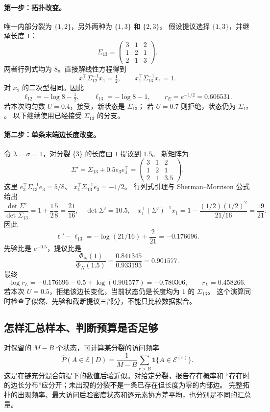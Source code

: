 \paragraph{第一步：拓扑改变。}
唯一内部分裂为 $\{1,2\}$，另外两种为 $\{1,3\}$ 和 $\{2,3\}$。
假设提议选择 $\{1,3\}$，并继承长度 $1$：
\[
 \Sigma_{13}=
 \begin{pmatrix}3&1&2\\1&2&1\\2&1&3\end{pmatrix}.
\]
两者行列式均为 $8$。直接解线性方程得到
\[
 x_1^\top\Sigma_{12}^{-1}x_1=\tfrac12,\qquad
 x_1^\top\Sigma_{13}^{-1}x_1=1.
\]
对 $x_2$ 的二次型相同。因此
\[
 \ell_{12}=-\log8-\tfrac12,\qquad
 \ell_{13}=-\log8-1,\qquad
 r_E=e^{-1/2}=0.606531.
\]
若本次均匀数 $U=0.4$，接受，新状态是 $\Sigma_{13}$；
若 $U=0.7$ 则拒绝，状态仍为 $\Sigma_{12}$。
以下继续使用已经接受 $\Sigma_{13}$ 的分支。

\paragraph{第二步：单条末端边长度改变。}
令 $\lambda=\sigma=1$，对分裂 $\{3\}$ 的长度由 $1$ 提议到 $1.5$。
新矩阵为
\[
 \Sigma'=\Sigma_{13}+0.5e_3e_3^\top
 =\begin{pmatrix}3&1&2\\1&2&1\\2&1&3.5\end{pmatrix}.
\]
这里
$e_3^\top\Sigma_{13}^{-1}e_3=5/8$、
$x_1^\top\Sigma_{13}^{-1}e_3=-1/2$。
行列式引理与 Sherman--Morrison 公式给出
\[
 \frac{\det\Sigma'}{\det\Sigma_{13}}=
 1+\frac12\frac58=\frac{21}{16},\quad
 \det\Sigma'=10.5,\quad
 x_1^\top(\Sigma')^{-1}x_1=1-\frac{(1/2)(1/2)^2}{21/16}
 =\frac{19}{21}.
\]
因此
\[
 \ell'-\ell_{13}
 =-\log(21/16)+\frac2{21}=-0.176696.
\]
先验比是 $e^{-0.5}$，提议比是
\[
 \frac{\Phi_N(1)}{\Phi_N(1.5)}
 =\frac{0.841345}{0.933193}=0.901577.
\]
最终
\[
 \log r_L=-0.176696-0.5+\log(0.901577)=-0.780306,
 \qquad r_L=0.458266.
\]
若本次 $U=0.5$，拒绝该边长变化，当前状态仍是长度均为 $1$ 的 $\Sigma_{13}$。
这个演算同时检查了似然、先验和截断提议三部分，不能只比较数据拟合。

\subsection{怎样汇总样本、判断预算是否足够}

对保留的 $M-B$ 个状态，可计算某分裂的访问频率
\[
 \widehat P(A\in\mathcal E\mid D)
 =\frac1{M-B}\sum_{r>B}\mathbf1\{A\in\mathcal E^{(r)}\}.
\]
这是在链充分混合前提下的数值后验近似。对给定分裂，报告存在概率和
“存在时的边长分布”应分开；未出现的分裂不是一条已存在但长度为零的内部边。
完整拓扑的出现频率、最大访问后验密度状态和逐元素协方差平均，也分别是不同的汇总量。

